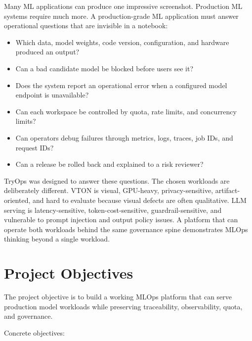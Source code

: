 \documentclass[12pt,a4paper,oneside]{report}
\begin{document}
Many ML applications can produce one impressive screenshot. Production ML systems require much more. A production-grade ML application must answer operational questions that are invisible in a notebook:

\begin{itemize}
  \item Which data, model weights, code version, configuration, and hardware produced an output?
  \item Can a bad candidate model be blocked before users see it?
  \item Does the system report an operational error when a configured model endpoint is unavailable?
  \item Can each workspace be controlled by quota, rate limits, and concurrency limits?
  \item Can operators debug failures through metrics, logs, traces, job IDs, and request IDs?
  \item Can a release be rolled back and explained to a risk reviewer?
\end{itemize}

TryOps was designed to answer these questions. The chosen workloads are deliberately different. VTON is visual, GPU-heavy, privacy-sensitive, artifact-oriented, and hard to evaluate because visual defects are often qualitative. LLM serving is latency-sensitive, token-cost-sensitive, guardrail-sensitive, and vulnerable to prompt injection and output policy issues. A platform that can operate both workloads behind the same governance spine demonstrates MLOps thinking beyond a single workload.

\section{Project Objectives}

The project objective is to build a working MLOps platform that can serve production model workloads while preserving traceability, observability, quota, and governance.

Concrete objectives:
\end{document}

